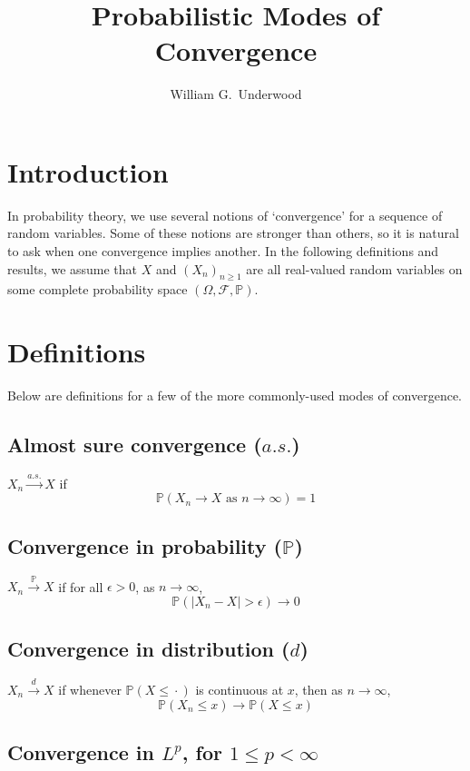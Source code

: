 \documentclass{article}
\title{Probabilistic Modes of Convergence}
\author{William G.\ Underwood}
\begin{document}
\maketitle

\section{Introduction}

In probability theory, we use several notions of `convergence' for
a sequence of random variables.
Some of these notions are stronger than others, so it is natural to ask
when one convergence implies another.
In the following definitions and results, we assume that $X$ and $(X_n)_{n \geq 1}$ are all
real-valued random variables on some complete probability space
$(\Omega, \mathcal{F}, \mathbb{P})$.


\section{Definitions}

Below are definitions for a few of the more
commonly-used modes of convergence.

\subsection*{Almost sure convergence ($a.s.$)}

$X_n \xrightarrow{a.s.} X$
if
$$\mathbb{P}(X_n \to X \text{ as } n \to \infty) = 1$$

\subsection*{Convergence in probability ($\mathbb{P}$)}

$X_n \xrightarrow{\mathbb{P}} X$
if for all $\epsilon > 0$,
as $n \to \infty$,
$$\mathbb{P}(|X_n - X| > \epsilon) \to 0$$

\subsection*{Convergence in distribution ($d$)}

$X_n \xrightarrow{d} X$
if whenever $\mathbb{P}(X \leq \,\boldsymbol{\cdot}\,)$ is continuous at $x$,
then as $n \to \infty$,
$$\mathbb{P}(X_n \leq x) \to \mathbb{P}(X \leq x)$$

\subsection*{Convergence in $L^p$, for $1 \leq p < \infty$}
\end{document}
